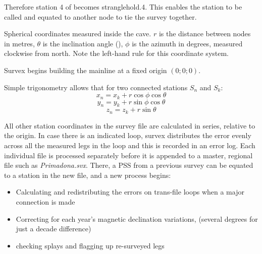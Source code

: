 Therefore station 4 of  becomes stranglehold.4. This enables the station to be called and equated to another node to tie the survey together. 

\begin{marginfigure}
\caption{Spherical coordinates measured inside the cave. $r$ is the distance between nodes in metres, $\theta$ is the inclination angle (\textdegree), $\phi$ is the azimuth in degrees, measured clockwise from north. Note the left-hand rule for this coordinate system.}
\end{marginfigure}

Survex begins building the mainline at a fixed origin  $(0;0;0)$.

Simple trigonometry allows that for two connected stations $S_n$ and $S_k$:
$$x_{n} = x_{k}+ r \cos\phi\cos\theta $$
$$y_{n} = y_{k}+ r \sin\phi\cos\theta $$
$$z_{n} = z_{k}+ r \sin\theta$$

 All other station coordinates in the survey file are calculated in series, relative to the origin. In case there is an indicated loop, survex distributes the error evenly across all the measured legs in the loop and this is recorded in an error log. Each individual file is processed separately before it is appended to a master, regional file such as \emph{Primadona.svx}. There, a PSS from a previous survey can be equated to a station in the new file, and a new process begins:
\begin{itemize}
\item Calculating and redistributing the errors on trans-file loops when a major connection is made
\item Correcting for each year's magnetic declination variations, (several degrees for just a decade difference)
\item checking splays and flagging up re-surveyed legs 
\end{itemize}

